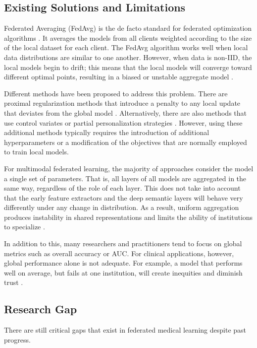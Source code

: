 \documentclass[utf8]{FrontiersinHarvard} %
\begin{document}
\subsection{Existing Solutions and Limitations}

Federated Averaging (FedAvg) is the de facto standard for federated optimization algorithms \citep{McMahan2017}. It averages the models from all clients weighted according to the size of the local dataset for each client. The FedAvg algorithm works well when local data distributions are similar to one another. However, when data is non-IID, the local models begin to drift; this means that the local models will converge toward different optimal points, resulting in a biased or unstable aggregate model \citep{Karimireddy2020,Li2020}.

Different methods have been proposed to address this problem. There are proximal regularization methods that introduce a penalty to any local update that deviates from the global model \citep{Li2020}. Alternatively, there are also methods that use control variates or partial personalization strategies \citep{Karimireddy2020,Collins2021}. However, using these additional methods typically requires the introduction of additional hyperparameters or a modification of the objectives that are normally employed to train local models.

For multimodal federated learning, the majority of approaches consider the model a single set of parameters. That is, all layers of all models are aggregated in the same way, regardless of the role of each layer. This does not take into account that the early feature extractors and the deep semantic layers will behave very differently under any change in distribution. As a result, uniform aggregation produces instability in shared representations and limits the ability of institutions to specialize \citep{Zhu2025}.

In addition to this, many researchers and practitioners tend to focus on global metrics such as overall accuracy or AUC. For clinical applications, however, global performance alone is not adequate. For example, a model that performs well on average, but fails at one institution, will create inequities and diminish trust \citep{Darzi2024,Li2021}.

\subsection{Research Gap}

There are still critical gaps that exist in federated medical learning despite past progress.
\end{document}
